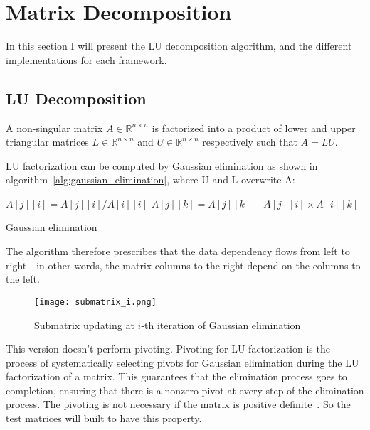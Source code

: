 \chapter{Matrix Decomposition}
\label{matrix_decomposition}
In this section I will present the LU decomposition algorithm, and the different implementations for each framework.
\section{LU Decomposition}
A non-singular matrix $A \in \mathbb{R}^{n \times n}$ is factorized into a product of lower and upper triangular matrices $L \in \mathbb{R}^{n \times n}$ and $U \in \mathbb{R}^{n \times n}$ respectively such that $A = LU$.

LU factorization can be computed by Gaussian elimination as
shown in algorithm~\ref{alg:gaussian_elimination}, where U and L overwrite A:

\begin{algorithm}
\begin{algorithmic}
		\State $A[j][i] = A[j][i] / A[i][i]$ 
	\EndFor
			\State $A[j][k] = A[j][k] - A[j][i] \times A[i][k]$ 
		\EndFor	
	\EndFor
\EndFor
\end{algorithmic}
\caption{Gaussian elimination}
\label{alg:gaussian_elimination}
\end{algorithm}

The algorithm therefore prescribes that the data dependency flows from left to right - in other words, the matrix columns to the right depend on the columns to the left. 

\begin{figure}[H]
\centering
\texttt{[image: submatrix\_i.png]}
\caption{Submatrix updating at $i$-th iteration of Gaussian elimination}
\end{figure}


This version doesn't perform pivoting. Pivoting for LU factorization is the process of systematically selecting pivots for Gaussian elimination
during the LU factorization of a matrix. This guarantees that the elimination process goes to completion, ensuring that there is a nonzero pivot at every step of the elimination process. The pivoting is not necessary if the matrix is positive definite~\cite{upenn_lu_positive_definite}. So the test matrices will built to have this property.


